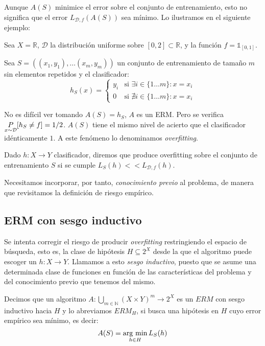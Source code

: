 Aunque $A(S)$ minimice el error sobre el conjunto de entrenamiento, esto no significa que el error $L_{\mathcal{D},f} (A(S))$ 
sea mínimo. Lo ilustramos en el siguiente ejemplo:

\begin{example}
Sea $X = \mathbb{R}$, $\mathcal{D}$ la distribución uniforme sobre $[0,2]\subset \mathbb{R}$, y la función
$f= \mathds{1}_{[0,1]}$.

Sea $S = ((x_1,y_1), \ldots (x_m, y_m))$ un conjunto de entrenamiento de tamaño $m$ sin elementos repetidos 
y el clasificador:
\[
  h_S(x) = \left\{\begin{array}{ll}
                   y_i & \textrm{si } \exists i\in \{1\ldots m\} : x=x_i\\
                   0   & \textrm{si } \nexists i\in \{1\ldots m\} : x=x_i
                   \end{array}\right.
\]

No es difícil ver tomando $A(S) = h_S$, $A$ es un ERM. Pero se verifica $\underset{x\sim \mathcal{D}}{P}[h_S \neq f] = 1/2$. $A(S)$ tiene el 
mismo nivel de acierto que el clasificador idénticamente $1$. A este fenómeno lo denominamos \textit{overfitting}.
\end{example}

\begin{definition}[Overfitting]
 Dado $h: X\rightarrow Y$ clasificador, diremos que produce overfitting sobre el conjunto de entrenamiento 
 $S$ si se cumple $L_S(h) << L_{\mathcal{D},f}(h)$.
\end{definition}

Necesitamos incorporar, por tanto, \textit{conocimiento previo} al problema, de manera que revisitamos la definición de riesgo
empírico.

\subsection{ERM con sesgo inductivo}
Se intenta corregir el riesgo de producir \emph{overfitting} restringiendo el espacio de búsqueda, esto es, la clase de 
hipótesis $H \subseteq 2^X$ desde la que el algoritmo puede escoger un $h: X\rightarrow Y$. Llamamos a esto 
\emph{sesgo inductivo}, puesto que se asume una determinada clase de funciones en función de las 
características del problema y del conocimiento previo que tenemos del mismo.

\begin{definition}
Decimos que un algoritmo $A: \underset{m\in \mathbb{N}}{\bigcup} (X\times Y)^m \rightarrow 2^{X}$ es un $ERM$ con sesgo 
inductivo hacia $H$ y lo abreviamos $ERM_H$, si busca una hipótesis en $H$ cuyo error empírico 
sea mínimo, es decir:
\[
  A(S) = \operatorname*{arg\,\min}_{h\in H} L_S(h)
\]
\end{definition}

